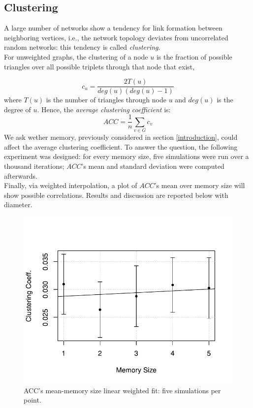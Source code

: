 \subsection{Clustering} \label{clustering}
A large number of networks show a tendency for link formation
between neighboring vertices, i.e., the network topology deviates
from uncorrelated random networks: this tendency is called
\textit{clustering}.\cite{clusterarticle}\\
For unweighted graphs, the clustering of a node $u$ is the fraction
of possible triangles over all possible triplets
through that node that exist,\cite{clustersite}

\begin{equation}
\label{eq:clustering}
c_u = \frac{2 T(u)}{deg(u)(deg(u)-1)}
\end{equation}
where $T(u)$ is the number of triangles through node $u$ and $deg(u)$ is the degree of $u$.
Hence, the \textit{average clustering coefficient}  is:
\begin{equation}
\label{eq:averageclustering}
ACC = \frac{1}{n}\sum_{v \in G} c_v
\end{equation}
We ask wether memory, previously considered in section
\ref{introduction}, could affect the average clustering coefficient.
To answer the question, the following experiment was designed:
for every memory size, five simulations were run over a thousand
iterations; $ACC$'s mean and standard deviation were computed
afterwards.\\
Finally, via weighted interpolation, a plot of $ACC$'s mean
over memory size will show possible  correlations.
Results and discussion are reported below with diameter.
\begin{figure}[h]
  \centering
  \includegraphics[trim={0cm 0cm 0cm 1cm},clip,width=.8\columnwidth]{img/clustering.pdf}
  \caption{ACC's mean-memory size linear weighted fit: five simulations per point.\label{fig:clustering}}
\end{figure}
